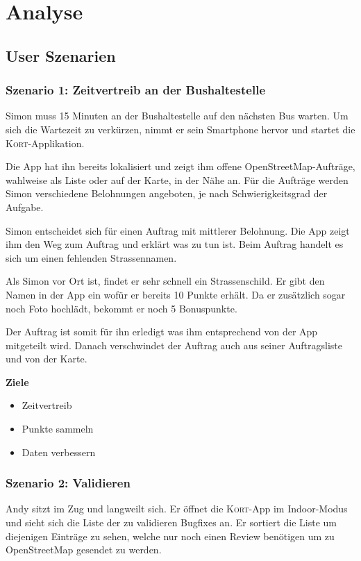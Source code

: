 \section{Analyse}

\subsection{User Szenarien}

\subsubsection{Szenario 1: Zeitvertreib an der Bushaltestelle}

Simon muss 15 Minuten an der Bushaltestelle auf den nächsten Bus warten.
Um sich die Wartezeit zu verkürzen, nimmt er sein Smartphone hervor und startet die \textsc{Kort}-Applikation.

Die App hat ihn bereits lokalisiert und zeigt ihm offene OpenStreetMap-Aufträge, wahlweise als Liste oder auf der Karte, in der Nähe an.
Für die Aufträge werden Simon verschiedene Belohnungen angeboten, je nach Schwierigkeitsgrad der Aufgabe.

Simon entscheidet sich für einen Auftrag mit mittlerer Belohnung.
Die App zeigt ihm den Weg zum Auftrag und erklärt was zu tun ist. Beim Auftrag handelt es sich um einen fehlenden Strassennamen.

Als Simon vor Ort ist, findet er sehr schnell ein Strassenschild.
Er gibt den Namen in der App ein wofür er bereits 10 Punkte erhält.
Da er zusätzlich sogar noch Foto hochlädt, bekommt er noch 5 Bonuspunkte.

Der Auftrag ist somit für ihn erledigt was ihm entsprechend von der App mitgeteilt wird.
Danach verschwindet der Auftrag auch aus seiner Auftragsliste und von der Karte.

\textbf{Ziele}
\begin{itemize}
\item Zeitvertreib
\item Punkte sammeln
\item Daten verbessern
\end{itemize}

\subsubsection{Szenario 2: Validieren}

Andy sitzt im Zug und langweilt sich. Er öffnet die \textsc{Kort}-App im Indoor-Modus und sieht sich die Liste der zu validieren Bugfixes an. Er sortiert die Liste um diejenigen Einträge zu sehen, welche nur noch einen Review benötigen um zu OpenStreetMap gesendet zu werden.

